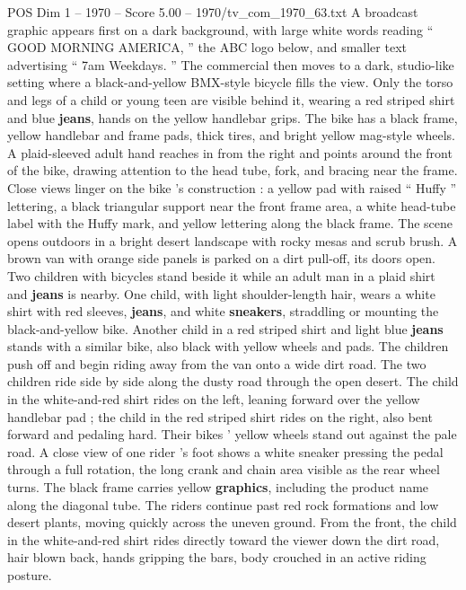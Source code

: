 \begin{textsample}{POS Dim 1 – 1970 – Score 5.00 – 1970/tv\_com\_1970\_63.txt}  \label{ex:f1_pos_070}
A broadcast graphic appears first on a dark background, with large white words reading “ GOOD MORNING AMERICA, ” the ABC logo below, and smaller text advertising “ 7am Weekdays. ” The commercial then moves to a dark, studio-like setting where a black-and-yellow BMX-style bicycle fills the view.
Only the torso and legs of a child or young teen are visible behind it, wearing a red striped shirt and blue \textbf{jeans}, hands on the yellow handlebar grips.
The bike has a black frame, yellow handlebar and frame pads, thick tires, and bright yellow mag-style wheels.
A plaid-sleeved adult hand reaches in from the right and points around the front of the bike, drawing attention to the head tube, fork, and bracing near the frame.
Close views linger on the bike ’s construction : a yellow pad with raised “ Huffy ” lettering, a black triangular support near the front frame area, a white head-tube label with the Huffy mark, and yellow lettering along the black frame.
The scene opens outdoors in a bright desert landscape with rocky mesas and scrub brush.
A brown van with orange side panels is parked on a dirt pull-off, its doors open.
Two children with bicycles stand beside it while an adult man in a plaid shirt and \textbf{jeans} is nearby.
One child, with light shoulder-length hair, wears a white shirt with red sleeves, \textbf{jeans}, and white \textbf{sneakers}, straddling or mounting the black-and-yellow bike.
Another child in a red striped shirt and light blue \textbf{jeans} stands with a similar bike, also black with yellow wheels and pads.
The children push off and begin riding away from the van onto a wide dirt road.
The two children ride side by side along the dusty road through the open desert.
The child in the white-and-red shirt rides on the left, leaning forward over the yellow handlebar pad ; the child in the red striped shirt rides on the right, also bent forward and pedaling hard.
Their bikes ’ yellow wheels stand out against the pale road.
A close view of one rider ’s foot shows a white sneaker pressing the pedal through a full rotation, the long crank and chain area visible as the rear wheel turns.
The black frame carries yellow \textbf{graphics}, including the product name along the diagonal tube.
The riders continue past red rock formations and low desert plants, moving quickly across the uneven ground.
From the front, the child in the white-and-red shirt rides directly toward the viewer down the dirt road, hair blown back, hands gripping the bars, body crouched in an active riding posture.

\end{textsample}
